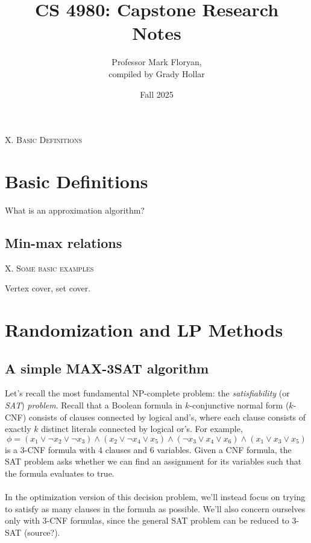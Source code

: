 \documentclass{article}
\title{CS 4980: Capstone Research\\
        Notes}
\author{Professor Mark Floryan,\\
        compiled by Grady Hollar}
\date{Fall 2025}
\begin{document}
\setlength{\abovedisplayskip}{4pt}
\setlength{\belowdisplayskip}{4pt}
\maketitle



\begin{center}
    \textsc{X. Basic Definitions}
\end{center}

\section{Basic Definitions}

What is an approximation algorithm?

\subsection{Min-max relations}


\begin{center}
    \textsc{X. Some basic examples}
\end{center}

Vertex cover, set cover.





\section{Randomization and LP Methods}

\subsection{A simple MAX-3SAT algorithm}

Let's recall the most fundamental NP-complete problem: the \textit{satisfiability} (or \textit{SAT}) \textit{problem}. Recall that a Boolean formula in $k$-conjunctive normal form ($k$-CNF) consists of clauses connected by logical and's, where each clause consists of exactly $k$ distinct literals connected by logical or's. For example,
\[
\phi = (x_1 \lor \neg x_2 \lor \neg x_3) \land (x_2 \lor \neg x_4 \lor x_5) \land (\neg x_3 \lor x_4 \lor x_6) \land (x_1 \lor x_3 \lor x_5)
\]
is a 3-CNF formula with 4 clauses and 6 variables. Given a CNF formula, the SAT problem asks whether we can find an assignment for its variables such that the formula evaluates to true.\\
\\
In the optimization version of this decision problem, we'll instead focus on trying to satisfy as many clauses in the formula as possible. We'll also concern ourselves only with 3-CNF formulas, since the general SAT problem can be reduced to 3-SAT (source?).
\end{document}
